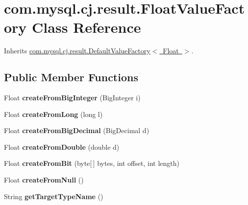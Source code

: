 \hypertarget{classcom_1_1mysql_1_1cj_1_1result_1_1_float_value_factory}{}\section{com.\+mysql.\+cj.\+result.\+Float\+Value\+Factory Class Reference}
\label{classcom_1_1mysql_1_1cj_1_1result_1_1_float_value_factory}


Inherits \mbox{\hyperlink{classcom_1_1mysql_1_1cj_1_1result_1_1_default_value_factory}{com.\+mysql.\+cj.\+result.\+Default\+Value\+Factory$<$ Float $>$}}.

\subsection*{Public Member Functions}
\begin{DoxyCompactItemize}
\item 
\mbox{\label{classcom_1_1mysql_1_1cj_1_1result_1_1_float_value_factory_a0dfaaba7d4aff7995021009f6d88d1fa}} 
Float {\bfseries create\+From\+Big\+Integer} (Big\+Integer i)
\item 
\mbox{\label{classcom_1_1mysql_1_1cj_1_1result_1_1_float_value_factory_abf1b10f3d17d8ee2b2860509ddcd4066}} 
Float {\bfseries create\+From\+Long} (long l)
\item 
\mbox{\label{classcom_1_1mysql_1_1cj_1_1result_1_1_float_value_factory_a9a644404852f6528743312d6b6485cba}} 
Float {\bfseries create\+From\+Big\+Decimal} (Big\+Decimal d)
\item 
\mbox{\label{classcom_1_1mysql_1_1cj_1_1result_1_1_float_value_factory_a7ddfc40bfc97a0c600b7e4279cf72e50}} 
Float {\bfseries create\+From\+Double} (double d)
\item 
\mbox{\label{classcom_1_1mysql_1_1cj_1_1result_1_1_float_value_factory_a58d315302a3bd1d91bf84f12c199ee7a}} 
Float {\bfseries create\+From\+Bit} (byte\mbox{[}$\,$\mbox{]} bytes, int offset, int length)
\item 
\mbox{\label{classcom_1_1mysql_1_1cj_1_1result_1_1_float_value_factory_a3ebb1a3dc2d6ddec958d9e399e04098c}} 
Float {\bfseries create\+From\+Null} ()
\item 
\mbox{\label{classcom_1_1mysql_1_1cj_1_1result_1_1_float_value_factory_ab08cb27a013fa18782ec3fdfa9a265c8}} 
String {\bfseries get\+Target\+Type\+Name} ()
\end{DoxyCompactItemize}


